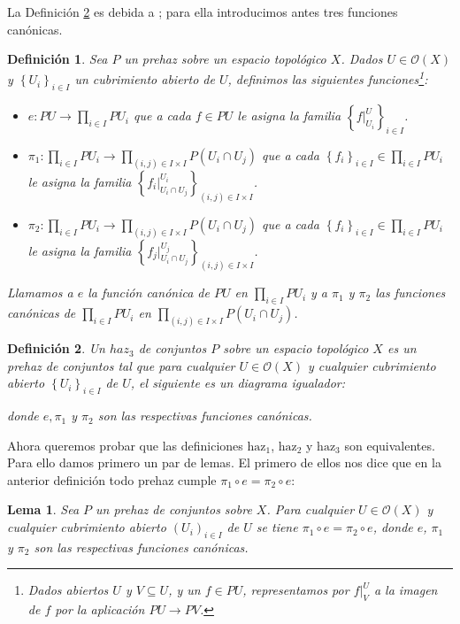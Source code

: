 \documentclass[letterpaper]{article} %
\newtheorem{Def}{Definición}
\newtheorem{Lema}{Lema}
\begin{document}
   La Definición \ref{def:Moerdijk} es debida a \cite[p.~66]{SGL}; para ella introducimos antes tres funciones canónicas.

   \begin{Def} 
      Sea $P$ un prehaz sobre un espacio topológico $X$. Dados $U\in\mathcal{O}(X)$ y $\left\lbrace U_i\right\rbrace_{i\in I}$ un cubrimiento abierto de $U$, definimos las siguientes funciones\footnote{Dados abiertos $U$ y $V\subseteq U$, y un $f\in PU$, representamos por $f|^U_V$ a la imagen de $f$ por la aplicación $PU\to PV$.}:
      \begin{itemize}
         \item $e:PU\to \prod_{i\in I}PU_i$ que a cada $f\in PU$ le asigna la familia $\left\lbrace f|^{U}_{U_i}\right\rbrace_{i\in I}$.
         \item $\pi_1:\prod_{i\in I}PU_i\to \prod_{(i,j)\in I\times I}P(U_i\cap U_j)$ que a cada $\left\lbrace f_i\right\rbrace_{i\in I}\in\prod_{i\in I}PU_i$ le asigna la familia $\left\lbrace {f_i}|^{U_i}_{U_i\cap U_j}\right\rbrace_{(i,j)\in I\times I}$.
         \item $\pi_2:\prod_{i\in I}PU_i\to \prod_{(i,j)\in I\times I}P(U_i\cap U_j)$ que a cada $\left\lbrace f_i\right\rbrace_{i\in I}\in\prod_{i\in I}PU_i$ le asigna la familia $\left\lbrace {f_j}|^{U_j}_{U_i\cap U_j}\right\rbrace_{(i,j)\in I\times I}$.
      \end{itemize}
      Llamamos a $e$ la función canónica de $PU$ en $\prod_{i\in I}PU_i$ y a $\pi_1$ y $\pi_2$ las funciones canónicas de $\prod_{i\in I}PU_i$ en $\prod_{(i,j)\in I\times I}P(U_i\cap U_j)$.
   \end{Def}

   \begin{Def}\label{def:Moerdijk}
      Un ${haz}_3$ de conjuntos $P$ sobre un espacio topológico $X$ es un prehaz de conjuntos tal que para cualquier $U\in \mathcal{O}(X)$ y cualquier cubrimiento abierto $\left\lbrace U_i\right\rbrace_{i\in I}$ de $U$, el siguiente es un diagrama igualador:
      
   donde $e,\pi_1$ y $\pi_2$ son las respectivas funciones canónicas.
   \end{Def}
   
   Ahora queremos probar que las definiciones ${\text{haz}}_1$, ${\text{haz}}_2$ y ${\text{haz}}_3$ son equivalentes. Para ello damos primero un par de lemas. El primero de ellos nos dice que en la anterior definición todo prehaz cumple $\pi _1\circ e = \pi _2 \circ e$:

   \begin{Lema}\label{Lema:Prehaz}
      Sea $P$ un prehaz de conjuntos sobre $X$. Para cualquier $U\in \mathcal{O}(X)$ y cualquier cubrimiento abierto $(U_i)_{i\in I}$ de $U$ se tiene $\pi_1\circ e=\pi_2\circ e$, donde $e$, $\pi_1$ y $\pi_2$ son las respectivas funciones canónicas.
   \end{Lema}
\end{document}
